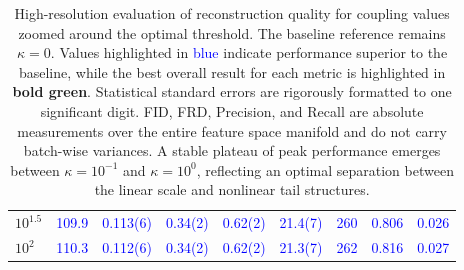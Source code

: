 \documentclass[twoside,11pt]{article}
\begin{document}
\begin{table}[ht!]
\begin{tabular}{lcccccccc}
$10^{1.5}$   & \textcolor{blue}{109.9} & \textcolor{blue}{0.113(6)} & \textcolor{blue}{0.34(2)} & \textcolor{blue}{0.62(2)} & \textcolor{blue}{21.4(7)} & \textcolor{blue}{260} & \textcolor{blue}{0.806} & \textcolor{blue}{0.026} \\
$10^{2}$     & \textcolor{blue}{110.3} & \textcolor{blue}{0.112(6)} & \textcolor{blue}{0.34(2)} & \textcolor{blue}{0.62(2)} & \textcolor{blue}{21.3(7)} & \textcolor{blue}{262} & \textcolor{blue}{0.816} & \textcolor{blue}{0.027} \\
\bottomrule
\end{tabular}
\caption{High-resolution evaluation of reconstruction quality for coupling values zoomed around the optimal threshold. The baseline reference remains $\kappa = 0$. Values highlighted in \textcolor{blue}{blue} indicate performance superior to the baseline, while the best overall result for each metric is highlighted in \textbf{\textcolor{green!50!black}{bold green}}. Statistical standard errors are rigorously formatted to one significant digit. FID, FRD, Precision, and Recall are absolute measurements over the entire feature space manifold and do not carry batch-wise variances. A stable plateau of peak performance emerges between $\kappa = 10^{-1}$ and $\kappa = 10^0$, reflecting an optimal separation between the linear scale and nonlinear tail structures.} 
\label{tab:metrics_absolute_zoom}
\end{table}
\end{document}
